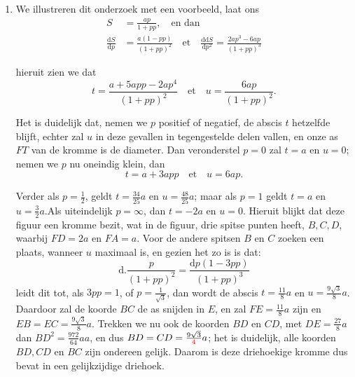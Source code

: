 \documentclass[10pt,a4paper]{article}
\newcommand{\switchenum}{\setcounter{enumi}{\arabic{enumi}-1}\switchcolumn}
\def\D{\mathrm{d}}
\begin{document}
\begin{paracol}{2}
\begin{enumerate}[topsep=1px]
		\switchenum
		\item We illustreren dit onderzoek met een voorbeeld, laat ons
		\begin{align*}
			S &= \frac{ap}{1+pp}, \quad\text{en dan}\\
			\frac{\D S}{\D p} &= \frac{a(1-pp)}{(1+pp)^2} \quad \text{et} \quad \frac{\D \D S}{\D p^2} = \frac{2ap^3-6ap}{(1+pp)^3}
		\end{align*}

		hieruit zien we dat
		\[
			t = \frac{a+5app-2ap^4}{(1+pp)^2}\quad \text{et} \quad u = \frac{6ap}{(1+pp)^2}.
		\]
		\par Het is duidelijk dat, nemen we $p$ positief of negatief, de abscis $t$ hetzelfde blijft, echter zal $u$ in deze gevallen in tegengestelde delen vallen, en onze as $FT$ van de kromme is de diameter. Dan veronderstel $p=0$ zal $t=a$ en $u=0$; nemen we $p$ nu oneindig klein, dan
		\[
			t = a + 3app\quad \text{et} \quad u= 6ap.
		\]
		\par Verder als $p=\frac{1}{2}$, geldt $t = \frac{34}{25}a$ en $u= \frac{48}{25}a$; maar als $p=1$ geldt $t=a$ en $u=\frac{3}{2}a$.Als uiteindelijk $p=\infty$, dan $t=-2a$ en $u=0$. Hieruit blijkt dat deze figuur een kromme bezit, wat in de figuur, drie spitse punten heeft, $B,C,D$, waarbij $FD=2a$ en $FA=a$. Voor de andere spitsen $B$ en $C$ zoeken een plaats, wanneer $u$ maximaal is, en gezien het zo is is dat:
		\[
			\D.\frac{p}{(1+pp)^2} = \frac{\D p(1-3pp)}{(1+pp)^3}
		\]
		leidt dit tot, als $3pp=1$, of $p=\frac{1}{\sqrt{3}}$, dan wordt de abscis $t=\frac{11}{8}a$ en $u=\frac{9\sqrt{3}}{8}a$. Daardoor zal de koorde $BC$ de as snijden in $E$, en zal $FE=\frac{11}{8}a$ zijn en $EB=EC=\frac{9\sqrt{3}}{8}a$. Trekken we nu ook de koorden $BD$ en $CD$, met $DE=\frac{27}{8}a$ dan $BD^2 = \frac{972}{64}aa$, en dus $BD=CD = \frac{9\sqrt{3}}{\color{red}4}a$; het is duidelijk, alle koorden $BD, CD$ en $BC$ zijn ondereen gelijk. Daarom is deze driehoekige kromme dus bevat in een gelijkzijdige driehoek.

		\switchcolumn*
		

\end{enumerate}
\end{paracol}
\end{document}
